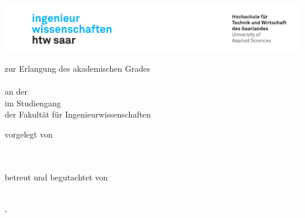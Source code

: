 \begin{titlepage}\linespread{1.5}\selectfont
\includegraphics[width=\linewidth]{Graphics/htwsaar_Logo_inwi_head_VF_4C_crop}
  \begin{center}
    \large  
    \hfill
    \vfill
    \begingroup
      \Large\bfseries\myDegreeType
    \endgroup
		
		\bigskip
	
	zur Erlangung des akademischen Grades \\	
    \myDegree \\ 
    an der \myUni \\
    im Studiengang \myDegreeCourse \\
    der Fakultät für Ingenieurwissenschaften \\ 
    
  \vfill
	
  \begingroup
    \Large\bfseries\myTitle 
  \endgroup
	
	\bigskip
	
  vorgelegt von \\
  \myName \\
  \mysecondName\\
  \mythirdName
	
	
  \vfill
	
  betreut und begutachtet von \\
  \myFirstProf \\
  
  \vfill
	
  \myLocation, \myTime                   

    \end{center}       
\end{titlepage}   
